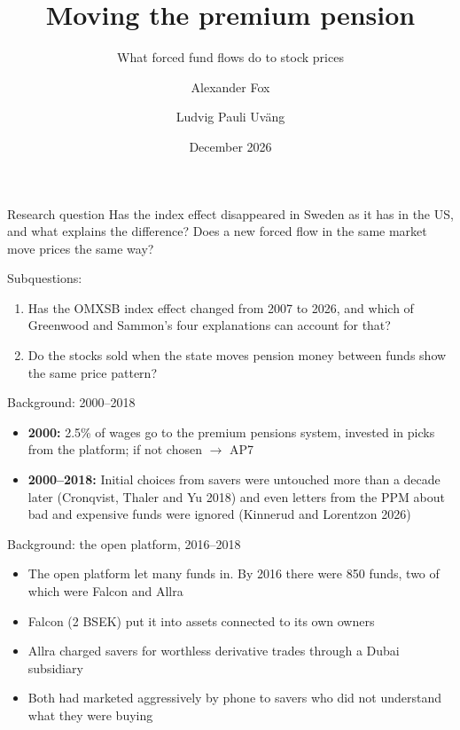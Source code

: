 \documentclass[aspectratio=169]{beamer}
\title[Finance Thesis Fall 26]{Moving the premium pension}
\subtitle{What forced fund flows do to stock prices}
\author[Alexander Fox \& Ludvig P Uväng]{Alexander Fox \and Ludvig Pauli Uväng}
\institute{Stockholm School of Economics}
\date{December 2026}
\begin{document}
\maketitle

\begin{frame}[label=question]{Research question}
  Has the index effect disappeared in Sweden as it has in the US, and what
  explains the difference? Does a new forced flow in the same market move
  prices the same way?

  \bigskip
  Subquestions:
  \begin{enumerate}
    \item Has the OMXSB index effect changed from 2007 to 2026, and which of
      Greenwood and Sammon's four explanations can account for that?
    \item Do the stocks sold when the state moves pension money between funds
      show the same price pattern?
  \end{enumerate}
\end{frame}

\begin{frame}[label=setting]{Background: 2000--2018}
  \begin{itemize}
    \item \textbf{2000:} 2.5\% of wages go to the premium pensions system,
      invested in picks from the platform; if not chosen $\rightarrow$ AP7
    \item \textbf{2000--2018:} Initial choices from savers were untouched more than
      a decade later (Cronqvist, Thaler and Yu 2018) and even letters from the PPM
      about bad and expensive funds were ignored (Kinnerud and Lorentzon 2026)
  \end{itemize}
\end{frame}

\begin{frame}{Background: the open platform, 2016--2018}
  \begin{itemize}
    \item The open platform let many funds in. By 2016 there were 850 funds,
      two of which were Falcon and Allra
    \item Falcon (2 BSEK) put it into assets connected to its own owners
    \item Allra charged savers for worthless derivative trades through a Dubai subsidiary
    \item Both had marketed aggressively by phone to savers who did not understand
      what they were buying
  \end{itemize}
\end{frame}
\end{document}
